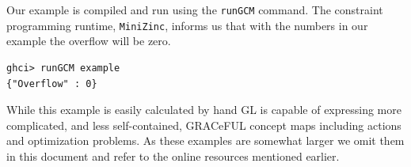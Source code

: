 Our example is compiled and run using the \texttt{runGCM} command.
%
The constraint programming runtime, \texttt{MiniZinc}, informs us
that with the numbers in our example the overflow will be zero.

\begin{verbatim}
ghci> runGCM example
{"Overflow" : 0}
\end{verbatim}

While this example is easily calculated by hand GL is capable of
expressing more complicated, and less self-contained, GRACeFUL concept
maps including actions and optimization problems.
%
As these examples are somewhat larger we omit them in this document
and refer to the online resources mentioned earlier.
